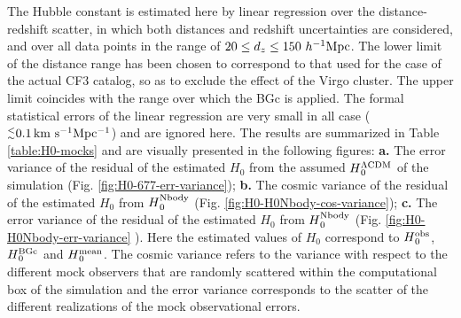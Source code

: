 \documentclass[useAMS,usenatbib]{mn2e}
\def\lesssim{{^<_\sim}}
\newcommand{\kmsMpc}{{\,\rm km \ s^{-1}Mpc^{-1}}}
\newcommand{\hmpc}{{\ifmmode{h^{-1}{\rm Mpc}}\else{$h^{-1}$Mpc}\fi}}
\begin{document}
The Hubble constant is estimated here by linear regression over the distance-redshift scatter, in which both distances and redshift uncertainties are considered, and over all data points in the range of $20 \leq d_z \leq 150 \ \hmpc$. The lower limit of the distance range has been chosen to correspond to that  used for the case of the actual CF3 catalog, so as  to exclude the effect of the Virgo cluster.  The upper limit coincides with the range over which the BGc is applied. The formal statistical errors of the linear regression are very small in all case ($\lesssim 0.1\kmsMpc$) and are ignored here. The results are summarized in Table \ref{table:H0-mocks} and are visually presented in the following figures:
{\bf a.} The  error variance of the residual of the estimated $H_0$ from the assumed $H{^{\rm \Lambda CDM}_0}$ of the simulation  (Fig. \ref{fig:H0-677-err-variance});
{\bf b.} The cosmic variance of the residual of the estimated $H_0$ from $H{^{\rm Nbody}_0}$ (Fig. \ref{fig:H0-H0Nbody-cos-variance});
{\bf c.} The error variance of the residual of the estimated $H_0$ from $H{^{\rm Nbody}_0}$ (Fig. \ref{fig:H0-H0Nbody-err-variance} ).
 Here the estimated values of $H_0$ correspond to $H{^{\rm obs}_0}$, $H{^{\rm BGc}_0}$ and $H{^{\rm mean}_0}$. The cosmic variance refers to the variance with respect to the different mock  observers that are randomly scattered within the computational box of the simulation and the error variance corresponds to the scatter of the different realizations of the mock observational errors.
 
\end{document}

